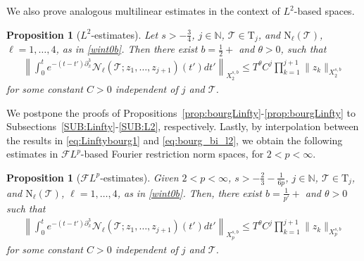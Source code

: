 \documentclass[%
11pt,  reqno]{amsart}
\newcommand{\5}{\textup{V}}
\newcommand{\FL}{\mathcal{F} L}
\newcommand{\dx}{\partial_x}
\newtheorem{proposition}[theorem]{Proposition}
\theoremstyle{remark}
\newcommand{\TT}{\mathcal{T}}
\newcommand{\Tr}{\mathrm{T}}
\newcommand{\ta}{\theta}
\renewcommand{\l}{\ell}
\newcommand{\N}{\mathbb{N}}
\numberwithin{equation}{section}
\numberwithin{theorem}{section}
\newcommand{\NN}{\mathrm{N}}
\newcommand{\Ncal}{\mathcal{N}}
\begin{document}
We also prove analogous multilinear estimates in the context of $L^2$-based spaces.

\begin{proposition}[$L^2$-estimates]\label{prop:bourgL2}
Let $s>-\frac34$, $j \in\N$, $\TT \in \Tr_j$, and $\NN_\l(\TT)$, $\l=1,\dots,4$, as in \eqref{wint0b}.
	Then there exist $b=\frac12+$ and $\ta>0$, such that
	\begin{align}\label{eq:bourg_bi_l2}
		\left\|\int_0^t e^{-(t-t')\dx^3} \Ncal_\l(\TT; z_1,\dots, z_{j+1})(t') dt'  \right\|_{X^{s,b}_{2}}  \le T^\ta C^j\prod_{k=1}^{j+1}\|z_k\|_{X^{s,b}_{2}}
	\end{align}
    for some constant $C>0$ independent of $j$ and $\TT$.
\end{proposition}


We postpone the proofs of Propositions~\ref{prop:bourgLinfty}-\ref{prop:bourgLinfty} to Subsections~\ref{SUB:Linfty}-\ref{SUB:L2}, respectively. Lastly, by interpolation between the results in \eqref{eq:Linftybourg1} and \eqref{eq:bourg_bi_l2}, we obtain the following estimates in $\FL^{p}$-based Fourier restriction norm spaces, for $2 < p <\infty$. 


\begin{proposition}[$\FL^p$-estimates]\label{prop:bourgLp}
Given $2 < p <\infty$, $s>-\frac{2}{3}-\frac{1}{6p}$, $j\in\N$,  $\TT\in \Tr_{j}$, and $\NN_\l(\TT)$, $\l=1,\dots, 4$, as in \eqref{wint0b}. Then,
there exist $b=\frac{1}{p'}+$ and $\ta>0$ such that
	\begin{align}\label{eq:bourg_bi_lp}
		\left\|\int_0^t e^{-(t-t')\dx^3} \Ncal_\l(\TT; z_1,\dots, z_{j+1})(t') dt'  \right\|_{X^{s,b}_{p}} 
        \le T^\ta C^j\prod_{k=1}^{j+1}\|z_k\|_{X^{s,b}_{p}}
	\end{align}
    for some constant $C>0$ independent of $j$ and $\TT$.
\end{proposition}
\end{document}
